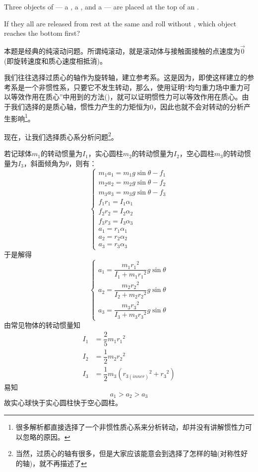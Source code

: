 \begin{solution}
	Three objects of  --- a , a , and a  --- are placed at the top of
	an . 
	\begin{center}
	\end{center}
	If they all are released from rest
	at the same  and roll without , which object reaches the bottom first?
	
	\tcbrule
	
	本题是经典的纯滚动问题。所谓纯滚动，就是滚动体与接触面接触的点速度为$\vec{0}$(即旋转速度和质心速度相抵消)。
	
	我们往往选择过质心的轴作为旋转轴，建立参考系。这是因为，即使这样建立的参考系是一个非惯性系，只要它不发生转动，那么，使用证明“均匀重力场中重力可以等效作用在质心”中用到的方法()，就可以证明惯性力可以等效作用在质心。由于我们选择的是质心轴，惯性力产生的力矩恒为$0$，因此也就不会对转动的分析产生影响\footnote{很多解析都直接选择了一个非惯性质心系来分析转动，却并没有讲解惯性力可以忽略的原因。}。
	
	现在，让我们选择质心系分析问题\footnote{当然，过质心的轴有很多，但是大家应该能意会到选择了怎样的轴(对称性好的轴)，就不再描述了}。
	
	若记球体$m_1$的转动惯量为$I_1$，实心圆柱$m_2$的转动惯量为$I_2$，空心圆柱$m_3$的转动惯量为$I_3$，斜面倾角为$\theta$，则有：
	\[\left\{
		\begin{array}{l}
			m_1a_1=m_1g\sin\theta-f_1\\
			m_2a_2=m_2g\sin\theta-f_2\\
			m_3a_3=m_3g\sin\theta-f_3\\
			 f_1r_1=I_1\alpha_1\\
			 f_2r_2=I_2\alpha_2\\
			 f_3r_3=I_3\alpha_3\\
			a_1=r_1\alpha_1\\
			a_2=r_2\alpha_2\\
			a_3=r_3\alpha_3
		\end{array}
	\right.\]
	于是解得
	\[\left\{
		\begin{array}{l}
			a_1=\dfrac{m_1r_1{}^2}{I_1+m_1r_1{}^2}g\sin\theta\\[2ex]
			a_2=\dfrac{m_2r_2{}^2}{I_2+m_2r_2{}^2}g\sin\theta\\[2ex]
			a_3=\dfrac{m_3r_3{}^2}{I_3+m_3r_3{}^2}g\sin\theta
		\end{array}
	\right.\]
	由常见物体的转动惯量知
	\begin{align*}
		I_1&=\dfrac{2}{5}m_1r_1{}^2\\
		I_2&=\dfrac{1}{2}m_2r_2{}^2\\
		I_3&=\dfrac{1}{2}m_3(r_{3(inner)}{}^2+r_3{}^2)
	\end{align*}
	易知
	\[a_1>a_2>a_3\]
	故实心球快于实心圆柱快于空心圆柱。
\end{solution}

